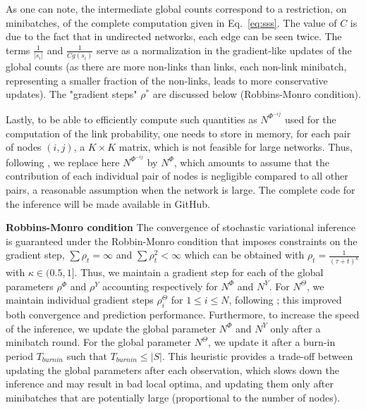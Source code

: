 %
As one can note, the intermediate global counts correspond to a restriction, on minibatches, of the complete computation given in Eq.~\ref{eq:sss}. The value of $C$ is due to the fact that in undirected networks, each edge can be seen twice. The terms $\frac{1}{|s_i|}$ and $\frac{1}{Cg(s_i)}$ serve as a normalization in the gradient-like updates of the global counts (as there are more non-links than links, each non-link minibatch, representing a smaller fraction of the non-links, leads to more conservative updates). The "gradient steps" $\rho^*$ are discussed below (Robbins-Monro condition).

Lastly, to be able to efficiently compute such quantities as $N^{\Phi^{-ij}}$ used for the computation of the link probability, one needs to store in memory, for each pair of nodes $(i,j)$, a $K \times K$ matrix, which is not feasible for large networks. Thus, following \cite{foulds2013stochastic}, we replace here $N^{\Phi^{-ij}}$ by $N^{\Phi}$, which amounts to assume that the contribution of each individual pair of nodes is negligible compared to all other pairs, a reasonable assumption when the network is large. The complete code for the inference will be made available in GitHub.

\textbf{Robbins-Monro condition} The convergence of stochastic variational inference is guaranteed under the Robbin-Monro condition \cite{robbins1951stochastic} that imposes constraints on the gradient step, $\sum \rho_t = \infty$ and $\sum \rho_t^2 < \infty$ which can be obtained with $\rho_t = \frac{1}{(\tau +t)^\kappa}$ with $\kappa \in (0.5, 1]$. Thus, we maintain a gradient step for each of the global parameters $\rho^\Phi$ and $\rho^Y$ accounting respectively for  $N^\Phi$ and $N^Y$. For $N^\Theta$, we maintain individual gradient steps $\rho_i^{\Theta}$ for $1\leq i\leq N$, following \cite{miller2009nonparametric}; this improved both convergence and prediction performance.%
Furthermore, to increase the speed of the inference, we update the global parameter $N^\Phi$ and $N^Y$ only after a minibatch round. For the global parameter $N^\Theta$, we update it after a burn-in period $T_{burnin}$ such that $T_{burnin} \leq |S|$.
This heuristic provides a trade-off between updating the global parameters after each observation, which slows down the inference and may result in bad local optima, and updating them only after minibatches that are potentially large (proportional to the number of nodes).

